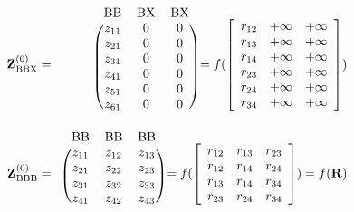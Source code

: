\begin{eqnarray}
\mathbf{Z}^{(0)}_{\mathrm{BBX}} & = & \begin{blockarray}{ccc}
  \mathrm{BB} & \mathrm{BX} & \mathrm{BX} \\
\begin{block}{(ccc)}
	z_{11} & 0        & 0        \\
	z_{21} & 0        & 0        \\
	z_{31} & 0        & 0        \\
	z_{41} & 0        & 0        \\
	z_{51} & 0        & 0        \\
	z_{61} & 0        & 0        \\
\end{block}
\end{blockarray} = 
f(\left[\begin{array}{ccc}
	r_{12} & +\infty  & +\infty  \\
	r_{13} & +\infty  & +\infty  \\
	r_{14} & +\infty  & +\infty  \\
	r_{23} & +\infty  & +\infty  \\
	r_{24} & +\infty  & +\infty  \\
	r_{34} & +\infty  & +\infty  \\
\end{array}
\right]) \\
\mathbf{Z}^{(0)}_{\mathrm{BBB}} & = & \begin{blockarray}{ccc}
\mathrm{BB} & \mathrm{BB} & \mathrm{BB} \\ 
\begin{block}{(ccc)}
	z_{11} & z_{12}   & z_{13}   \\
	z_{21} & z_{22}   & z_{23}   \\
	z_{31} & z_{32}   & z_{33}   \\
	z_{41} & z_{42}   & z_{43}   \\
\end{block}
\end{blockarray} =
f(\left[\begin{array}{ccc}
	r_{12} & r_{13}   & r_{23}   \\
	r_{12} & r_{14}   & r_{24}   \\
	r_{13} & r_{14}   & r_{34}   \\
	r_{23} & r_{24}   & r_{34}   \\
\end{array}
\right]) = f(\mathbf{R})
\end{eqnarray}

